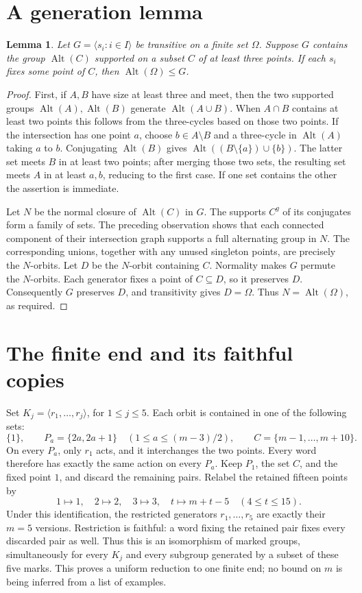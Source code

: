 \documentclass[11pt]{article}
\newcommand{\gen}[1]{\langle #1\rangle}
\newcommand{\Alt}{\operatorname{Alt}}
\newtheorem{lemma}[theorem]{Lemma}
\begin{document}
\section{A generation lemma}
\begin{lemma}\label{generation}
Let $G=\gen{s_i:i\in I}$ be transitive on a finite set $\Omega$. Suppose
$G$ contains the group $\Alt(C)$ supported on a subset $C$ of at least
three points. If each $s_i$ fixes some point of $C$, then
$\Alt(\Omega)\leq G$.
\end{lemma}
\begin{proof}
First, if $A,B$ have size at least three and meet, then the two supported
groups $\Alt(A),\Alt(B)$ generate $\Alt(A\cup B)$. When $A\cap B$
contains at least two points this follows from the three-cycles based on those two
points. If the intersection has one point $a$, choose $b\in A\setminus B$
and a three-cycle in $\Alt(A)$ taking $a$ to $b$. Conjugating
$\Alt(B)$ gives $\Alt((B\setminus\{a\})\cup\{b\})$. The latter
set meets $B$ in at least two points; after merging those two sets,
the resulting set meets $A$ in at least $a,b$, reducing to the first case.
If one set contains the other the assertion is immediate.

Let $N$ be the normal closure of $\Alt(C)$ in $G$. The supports $C^g$
of its conjugates form a family of sets. The preceding observation shows
that each connected component of their intersection graph supports a
full alternating group in $N$. The corresponding unions, together with
any unused singleton points, are precisely the $N$-orbits. Let $D$ be
the $N$-orbit containing $C$. Normality makes $G$ permute the $N$-orbits.
Each generator fixes a point of $C\subseteq D$, so it preserves $D$.
Consequently $G$ preserves $D$, and transitivity gives $D=\Omega$.
Thus $N=\Alt(\Omega)$, as required.
\end{proof}

\section{The finite end and its faithful copies}
Set $K_j=\gen{r_1,\ldots,r_j}$, for $1\leq j\leq5$. Each orbit is contained in one of the following sets:
\[
 \{1\},\qquad P_a=\{2a,2a+1\}\quad
 (1\leq a\leq(m-3)/2),\qquad C=\{m-1,\ldots,m+10\}.
\]
On every $P_a$, only $r_1$ acts, and it interchanges the two points.
Every word therefore has exactly the same action on every $P_a$.
Keep $P_1$, the set $C$, and the fixed point $1$, and discard the
remaining pairs. Relabel the retained fifteen points by
\begin{equation}\label{identification}
 1\mapsto1,\quad 2\mapsto2,\quad3\mapsto3,\quad
 t\mapsto m+t-5\quad(4\leq t\leq15).
\end{equation}
Under this identification, the restricted generators $r_1,\ldots,r_5$
are exactly their $m=5$ versions. Restriction is faithful: a word fixing
the retained pair fixes every discarded pair as well. Thus this is an
isomorphism of marked groups, simultaneously for every $K_j$ and every
subgroup generated by a subset of these five marks. This proves a
uniform reduction to one finite end; no bound on $m$ is being inferred
from a list of examples.
\end{document}
